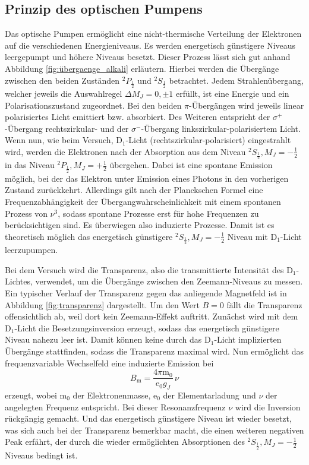 \subsection{Prinzip des optischen Pumpens}
Das optische Pumpen ermöglicht eine nicht-thermische Verteilung der 
Elektronen auf die verschiedenen Energieniveaus. Es werden energetisch
günstigere Niveaus leergepumpt und höhere Niveaus besetzt. 
Dieser Prozess lässt sich gut anhand Abbildung \ref{fig:übergaenge_alkali}
erläutern.
Hierbei werden die Übergänge zwischen den beiden Zuständen $^2P_{\frac{1}{2}}$ und $^2S_{\frac{1}{2}}$ betrachtet.
Jedem Strahlenübergang, welcher jeweils die Auswahlregel $\Delta M_J = 0, \pm 1$ erfüllt, ist eine Energie und ein Polarisationszustand zugeordnet.
Bei den beiden $\pi$-Übergängen wird jeweils linear polarisiertes Licht
emittiert bzw. absorbiert. Des Weiteren entspricht der $\sigma^+$-Übergang
rechtszirkular- und der $\sigma^-$-Übergang linkszirkular-polarisiertem Licht.
Wenn nun, wie beim Versuch, D$_1$-Licht (rechtszirkular-polarisiert)
eingestrahlt wird, werden die Elektronen nach der Absorption aus 
dem Niveau $^2S_{\frac{1}{2}}, M_J = -\frac{1}{2}$ in das Niveau 
$^2P_{\frac{1}{2}}, M_J = +\frac{1}{2}$ übergehen. Dabei ist eine 
spontane Emission möglich, bei der das Elektron unter Emission eines 
Photons in den vorherigen Zustand zurückkehrt. Allerdings gilt nach
der Planckschen Formel eine Frequenzabhängigkeit der 
Übergangwahrscheinlichkeit mit einem spontanen Prozess von $\nu^3$, sodass
spontane Prozesse erst für hohe Frequenzen zu berücksichtigen sind.
Es überwiegen also induzierte Prozesse. Damit ist es theoretisch möglich
das energetisch günstigere  $^2S_{\frac{1}{2}}, M_J = -\frac{1}{2}$ Niveau
mit D$_1$-Licht leerzupumpen.

Bei dem Versuch wird die Transparenz, also die transmittierte Intensität 
des D$_1$-Lichtes, verwendet, um die Übergänge zwischen den Zeemann-Niveaus
zu messen.
Ein typischer Verlauf der Transparenz gegen das anliegende Magnetfeld
ist in Abbildung \ref{fig:transparenz} dargestellt. 
Um den Wert $B=0$ fällt die Transparenz offensichtlich ab, weil dort
kein Zeemann-Effekt auftritt.
Zunächst wird mit dem D$_1$-Licht die Besetzungsinversion erzeugt, sodass
das energetisch günstigere Niveau nahezu leer ist. Damit können keine
durch das D$_1$-Licht implizierten Übergänge stattfinden, sodass die
Transparenz maximal wird. Nun ermöglicht das frequenzvariable 
Wechselfeld eine induzierte Emission bei
\begin{equation}
	B_{\mathrm{m}} = \frac{4\pi \mathrm{m}_0}{\mathrm{e}_0 g_J} \, \nu
\end{equation}
erzeugt, wobei $\mathrm{m}_0$ der Elektronenmasse, $\mathrm{e}_0$ der 
Elementarladung und $\nu$ der angelegten Frequenz entspricht.
Bei dieser Resonanzfrequenz $\nu$ wird die Inversion rückgängig gemacht.
Und das energetisch günstigere Niveau ist wieder besetzt, was sich auch
bei der Transparenz bemerkbar macht, die einen weiteren negativen Peak
erfährt, der durch die wieder ermöglichten Absorptionen des 
$^2S_{\frac{1}{2}}, M_J = -\frac{1}{2}$ Niveaus bedingt ist.





